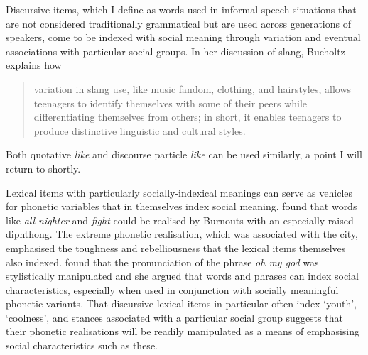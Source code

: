 Discursive items, which I define as words used in informal speech situations that are not considered traditionally grammatical but are used across generations of speakers, come to be indexed with social meaning through variation and eventual associations with particular social groups. In her discussion of slang, Bucholtz explains how

\begin{quote}
	variation in slang use, like music fandom, clothing, and hairstyles, allows teenagers to identify themselves with some of their peers while differentiating themselves from others; in short, it enables teenagers to produce distinctive linguistic and cultural styles. \citep[251]{bucholtz2006}
\end{quote}

\noindent Both quotative \textit{like} and discourse particle \textit{like} can be used similarly, a point I will return to shortly.

Lexical items with particularly socially-indexical meanings can serve as vehicles for phonetic variables that in themselves index social meaning. \citet{eckert1996} found that words like \textit{all-nighter} and \textit{fight} could be realised by Burnouts with an especially raised  diphthong. The extreme phonetic realisation, which was associated with the city, emphasised the toughness and rebelliousness that the lexical items themselves also indexed. \citet{chun2007} found that the pronunciation of the phrase \textit{oh my god} was stylistically manipulated and she argued that words and phrases can index social characteristics, especially when used in conjunction with socially meaningful phonetic variants. That discursive lexical items in particular often index `youth', `coolness', and stances associated with a particular social group suggests that their phonetic realisations will be readily manipulated as a means of emphasising social characteristics such as these.








